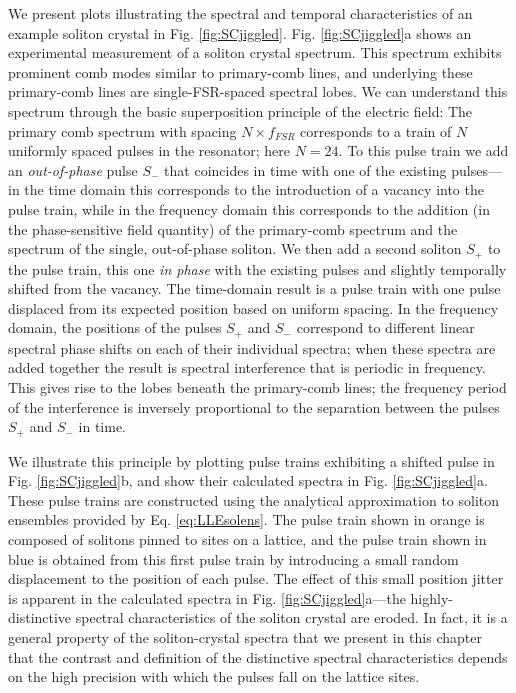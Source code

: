 We present plots illustrating the spectral and temporal characteristics of an example soliton crystal in Fig. \ref{fig:SCjiggled}. Fig. \ref{fig:SCjiggled}a shows an experimental measurement of a soliton crystal spectrum. This spectrum exhibits prominent comb modes similar to primary-comb lines, and underlying these primary-comb lines are single-FSR-spaced spectral lobes. We can understand this spectrum through the basic superposition principle of the electric field: The primary comb spectrum with spacing $N\times f_{FSR}$ corresponds to a train of $N$ uniformly spaced pulses in the resonator; here $N=24$. To this pulse train we add an \textit{out-of-phase} pulse $S_-$ that coincides in time with one of the existing pulses---in the time domain this corresponds to the introduction of a vacancy into the pulse train, while in the frequency domain this corresponds to the addition (in the phase-sensitive field quantity) of the primary-comb spectrum and the spectrum of the single, out-of-phase soliton. We then add a second soliton $S_+$  to the pulse train, this one \textit{in phase} with the existing pulses and slightly temporally shifted from the vacancy. The time-domain result is a pulse train with one pulse displaced from its expected position based on uniform spacing. In the frequency domain, the positions of the pulses $S_+$ and $S_-$ correspond to different linear spectral phase shifts on each of their individual spectra; when these spectra are added together the result is spectral interference that is periodic in frequency. This gives rise to the lobes beneath the primary-comb lines; the frequency period of the interference is inversely proportional to the separation between the pulses $S_+$ and $S_-$ in time.


We illustrate this principle by plotting pulse trains exhibiting a shifted pulse in Fig. \ref{fig:SCjiggled}b, and show their calculated spectra in Fig. \ref{fig:SCjiggled}a. These pulse trains are constructed using the analytical approximation to soliton ensembles provided by Eq. \ref{eq:LLEsolens}. The pulse train shown in orange is composed of solitons pinned to sites on a lattice, and the pulse train shown in blue is obtained from this first pulse train by introducing a small random displacement to the position of each pulse. The effect of this small position jitter is apparent in the calculated spectra in Fig. \ref{fig:SCjiggled}a---the highly-distinctive spectral characteristics of the soliton crystal are eroded. In fact, it is a general property of the soliton-crystal spectra that we present in this chapter that the contrast and definition of the distinctive spectral characteristics depends on the high precision with which the pulses fall on the lattice sites.



